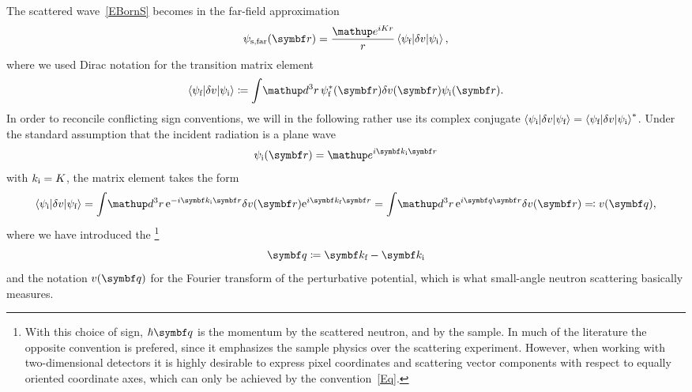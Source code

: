 The scattered wave~\cref{EBornS}
becomes in the far-field approximation
\begin{equation}\label{EsandwichC}
  \psi_\text{s,far}(\r)
  = \frac{\e^{iKr}}{r}
    \bra \psi_\tf|\delta v|\psi_\ti\ket,
\end{equation}
%
where we used Dirac notation for the transition matrix element
%
\begin{equation}\label{Etrama}
  \bra \psi_\tf|\delta v|\psi_\ti\ket
  \coloneqq  \int\!\d^3r\, \psi^*_\tf(\r)\delta v(\r)\psi_\ti(\r).
\end{equation}
%
In order to reconcile conflicting sign conventions,
we will in the following rather use its complex conjugate
$\left\langle \psi_{\text{i}}|\delta v|\psi_{\text{f}}\right\rangle = \left\langle \psi_{\text{f}}|\delta v|\psi_{\text{i}}\right\rangle^*$.
Under the standard assumption
that the incident radiation is a plane wave
%
\begin{equation}\label{EPsi0Plane}
  \psi_\ti(\r)=\e^{i \k_\ti \r}
\end{equation}
with $k_{\text{i}}=K$,
the matrix element takes the form
\begin{equation}\label{Echiq}
  \bra \psi_\ti|\delta v|\psi_\tf\ket
  = \int\!\d^3r\, {\rm e}^{-i\k_\ti\r}\delta v(\r){\rm e}^{i\k_\tf\r}
  = \int\!\d^3r\, {\rm e}^{i\q\r}\delta v(\r)
  \eqqcolon v(\q),
\end{equation}
%
where we have introduced the \footnote
{With this choice of sign,
%
$\hbar\q$ is the momentum
%
 by the scattered neutron,
and  by the sample.
In much of the literature the opposite convention is prefered,
since it emphasizes the sample physics over the scattering experiment.
However, when working with two-dimensional detectors
it is highly desirable to express pixel coordinates
and scattering vector components
with respect to equally oriented coordinate axes,
which can only be achieved by the convention~\cref{Eq}.}
%
\begin{equation}\label{Eq}
  \q\coloneqq \k_\tf-\k_\ti
\end{equation}
%
and the notation $v(\q)$ for
the Fourier transform of the perturbative potential,
%
which is what small-angle neutron scattering basically measures.

